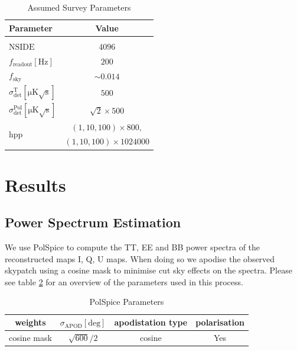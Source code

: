 \documentclass[apj]{emulateapj}
\begin{document}
\begin{table}[tbh] %
\begin{center}
\caption{\label{tab:modelparams} Assumed Survey Parameters}
\small
\begin{tabular}{l | c}
Parameter & Value\\
\hline \\[-1.5ex]
$\mathrm{NSIDE}$ &$4096$\\
$f_{\mathrm{readout}} [\mathrm{Hz}]$ &$200$\\
$f_{{\mathrm{sky}}}$ & $\sim 0.014$\\
$\sigma^{\mathrm{T}}_{\mathrm{det}} [\mathrm{\mu K \sqrt{s}}]$ &$500$\\
$\sigma^{\mathrm{Pol}}_{\mathrm{det}} [\mathrm{\mu K \sqrt{s}}]$ & $\sqrt{2}\times500$\\
\multirow{2}{*}{$\mathrm{hpp}$} & $\left(1, 10, 100 \right) \times 800,$\\
& $\left( 1, 10, 100 \right) \times 1024000$ \\
\end{tabular}
 \normalsize
\end{center}
\end{table}



\section{Results}
\label{sec:results}

\subsection{Power Spectrum Estimation}
\label{subsec:psestimation}

We use PolSpice to compute the TT, EE and BB power spectra of the reconstructed maps I, Q, U maps. When doing so we apodise the observed skypatch using a cosine mask to minimise cut sky effects on the spectra. Please see table \ref{tab:polspiceparams} for an overview of the parameters used in this process.

\begin{table}[tbh]
\begin{center}
\caption{\label{tab:polspiceparams} PolSpice Parameters}
\small
\begin{tabular}{c c c c}
weights & $\sigma_{\mathrm{APOD}} [\mathrm{deg}]$ & apodistation type & polarisation \\
\hline
cosine mask & $\sqrt{600}/2$ & cosine & Yes \\

\end{tabular}
 \normalsize
\end{center}
\end{table}
\end{document}
